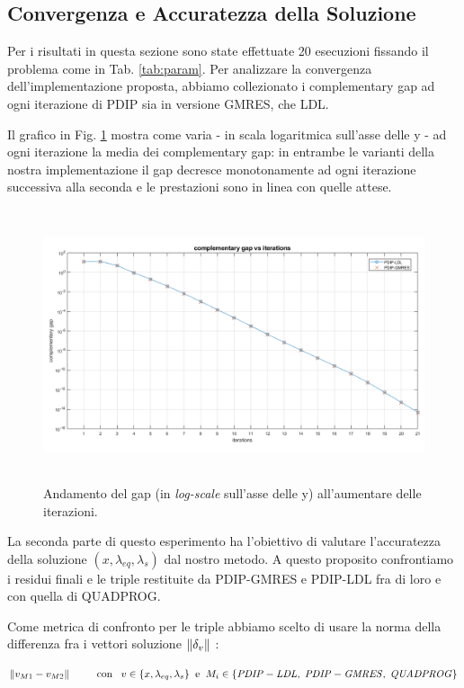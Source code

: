\subsection{Convergenza e Accuratezza della Soluzione}

Per i risultati in questa sezione sono state effettuate 20 esecuzioni fissando il problema come in Tab. \ref{tab:param}.
Per analizzare la convergenza dell'implementazione proposta, abbiamo collezionato i complementary gap ad ogni iterazione di PDIP sia in versione GMRES, che LDL.

Il grafico in Fig. \ref{fig:gap} mostra come varia - in scala logaritmica sull'asse delle y - ad ogni iterazione la media dei complementary gap: in entrambe le varianti della nostra implementazione il gap decresce monotonamente ad ogni iterazione successiva alla seconda e le prestazioni sono in linea con quelle attese.

\begin{figure}[!h]
    \centering
    \includegraphics[width=\textwidth, height = 8cm]{img/MU6.png}
    \caption{Andamento del gap (in \textit{log-scale} sull'asse delle y) all'aumentare delle iterazioni. \label{fig:gap}}
\end{figure}

La seconda parte di questo esperimento ha l'obiettivo di valutare l'accuratezza della soluzione $(x, \lambda_{eq}, \lambda_s)$ dal nostro metodo. A questo proposito confrontiamo i residui finali e le triple restituite da PDIP-GMRES e PDIP-LDL fra di loro e con quella di QUADPROG. 

Come metrica di confronto per le triple abbiamo scelto di usare la norma della differenza fra i vettori soluzione $\left\lVert\delta_v\right\rVert$ :

\begin{equation}\label{ep:acc}
     \left\lVert v_{M1} - v_{M2}\right\rVert \;\;\;\;\;\;\;\;\; \mathrm{con} \;\;\; v\in \{ x, \lambda_{eq}, \lambda_s\} \;\; \mathrm{e} \;\; M_i \in \{{\scriptsize\mathit{PDIP-LDL},\; \mathit{PDIP-GMRES}, \; \mathit{QUADPROG}}\}
\end{equation}

